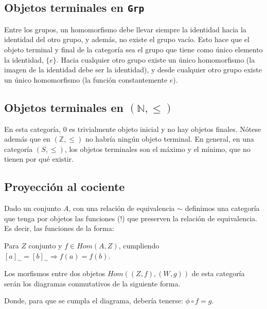 \documentclass[11pt, fleqn, spanish]{book}
\begin{document}
    \subsection {Objetos terminales en \texttt{Grp}}
      Entre los grupos, un homomorfismo debe llevar siempre la identidad hacia la identidad
      del otro grupo, y además, no existe el grupo vacío. Esto hace que el objeto terminal
      y final de la categoría sea el grupo que tiene como único elemento la identidad, $\{e\}$.
      Hacia cualquier otro grupo existe un único homomorfismo (la imagen de la identidad debe ser
      la identidad), y desde cualquier otro grupo existe un único homomorfismo (la función 
      constantemente $e$).
    
    \subsection {Objetos terminales en $(\mathbb{N},\leq)$}
      En esta categoría, $0$ es trivialmente objeto inicial y no hay objetos finales.
      Nótese además que en $(\mathbb{Z},\leq)$ no habría ningún objeto terminal. En general,
      en una categoría $(S,\leq)$, los objetos terminales son el máximo y el mínimo, que
      no tienen por qué existir.
    
    \subsection {Proyección al cociente}
      Dado un conjunto $A$, con una relación de equivalencia $\sim$ definimos una categoría
      que tenga por objetos las funciones (!) que preserven la relación de equivalencia.
      Es decir, las funciones de la forma:
      \begin{center}
      \end{center}
      Para $Z$ conjunto y $f \in Hom(A,Z)$, cumpliendo $[a]_{\sim} = [b]_{\sim} \Rightarrow f(a) = f(b)$.
      
      Los morfismos entre dos objetos $Hom((Z,f), (W,g))$ de esta categoría serán los diagramas
      conmutativos de la siguiente forma.
      \begin{center}
      \end{center}
      Donde, para que se cumpla el diagrama, debería tenerse: $\phi \circ f = g$.
      
\end{document}
